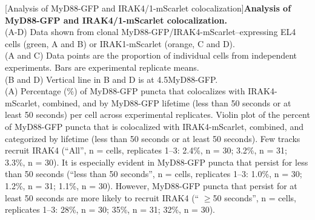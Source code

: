 \begin{centering}
\captionsetup{parbox=none}
[Analysis of MyD88-GFP and IRAK4/1-mScarlet colocalization]{\textbf{Analysis of MyD88-GFP and IRAK4/1-mScarlet colocalization.}
\vspace{1em}
\\
(A-D) Data shown from clonal MyD88-GFP/IRAK4-mScarlet--expressing EL4 cells (green, A and B) or IRAK1-mScarlet (orange, C and D).
\vspace{1em}
\\
(A and C) Data points are the proportion of individual cells from independent experiments. Bars are experimental replicate means.
\vspace{1em}
\\
(B and D) Vertical line in B and D is at 4.5\times MyD88-GFP.
\vspace{1em}
\\
(A) Percentage (\%) of MyD88-GFP puncta that colocalizes with IRAK4-mScarlet, combined, and by MyD88-GFP lifetime (less than 50 seconds or at least 50 seconds) per cell across experimental replicates. Violin plot of the percent of MyD88-GFP puncta that is colocalized with IRAK4-mScarlet, combined, and categorized by lifetime (less than 50 seconds or at least 50 seconds). Few tracks recruit IRAK4 (“All”, n = cells, replicates 1--3: 2.4\%, n = 30; 3.2\%, n = 31; 3.3\%, n = 30). It is especially evident in MyD88-GFP puncta that persist for less than 50 seconds (“less than 50 seconds”, n = cells, replicates 1--3: 1.0\%, n = 30; 1.2\%, n = 31; 1.1\%, n = 30). However, MyD88-GFP puncta that persist for at least 50 seconds are more likely to recruit IRAK4 (“ $\geq$50 seconds”, n = cells, replicates 1--3: 28\%, n = 30; 35\%, n = 31; 32\%, n = 30).
}
\end{centering}
